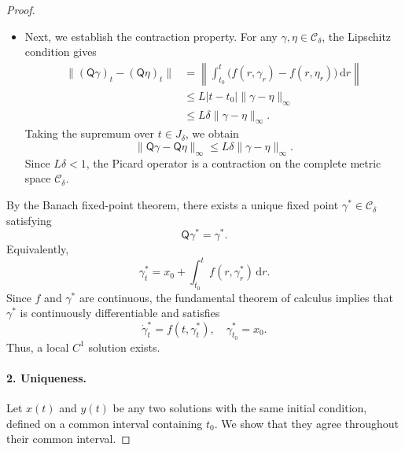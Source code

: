 \documentclass[12pt,a4paper,oneside]{book}
\begin{document}
\begin{proof}
\begin{itemize}
    \item Next, we establish the contraction property. For any $\gamma,\eta\in\mathcal C_\delta$, the Lipschitz condition
        gives
        \begin{equation*}
            \begin{aligned}
                \|(\mathsf Q\gamma)_t-(\mathsf Q\eta)_t\| &=
                \left\|
                    \int_{t_0}^{t} \bigl(f(r,\gamma_r)-f(r,\eta_r)\bigr)\,\mathrm dr
                \right\|\\
                &\leq L|t-t_0|\|\gamma-\eta\|_\infty\\
                &\leq L\delta\|\gamma-\eta\|_\infty.
            \end{aligned}
        \end{equation*}
        Taking the supremum over $t\in J_\delta$, we obtain
        \begin{equation*}
            \|\mathsf Q\gamma-\mathsf Q\eta\|_\infty
            \leq
            L\delta\|\gamma-\eta\|_\infty.
        \end{equation*}
        Since $L\delta<1$, the Picard operator is a contraction on the complete metric space $\mathcal C_\delta$.
\end{itemize}

By the Banach fixed-point theorem, there exists a unique fixed point $\gamma^*\in\mathcal C_\delta$ satisfying
\begin{equation*}
    \mathsf Q\gamma^*=\gamma^*.
\end{equation*}
Equivalently,
\begin{equation*}
    \gamma_t^* = x_0+\int_{t_0}^{t}f(r,\gamma_r^*)\,\mathrm dr.
\end{equation*}
Since $f$ and $\gamma^*$ are continuous, the fundamental theorem of calculus implies that $\gamma^*$ is continuously
differentiable and satisfies
\begin{equation*}
    \dot\gamma_t^*=f(t,\gamma_t^*), \quad \gamma_{t_0}^*=x_0.
\end{equation*}
Thus, a local $C^1$ solution exists.

\paragraph{2. Uniqueness.}

Let $x(t)$ and $y(t)$ be any two solutions with the same initial condition, defined on a common interval containing $t_0$.
We show that they agree throughout their common interval.


\end{proof}
\end{document}
